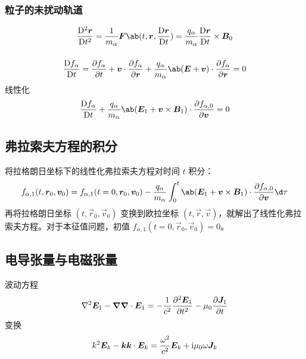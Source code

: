 \subsubsection{粒子的未扰动轨道}

\begin{equation}
\mdv[2]{\vec{r}}{t} = \frac{1}{m_\alpha} \vec{F}\ab(t, \vec{r}, \mdv{\vec{r}}{t})
= \frac{q_\alpha}{m_\alpha} \mdv{\vec{r}}{t} \times \vec{B}_0
\end{equation}

\subsubsection{}

\begin{equation}
\mdv{f_\alpha}{t} = \pdv{f_\alpha}{t}
+ \vec{v} \cdot \pdv{f_\alpha}{\vec{r}}
+ \frac{q_\alpha}{m_\alpha} \ab(\vec{E} + \vec{v} \textbf{}) \cdot \pdv{f_\alpha}{\vec{r}}
= 0
\end{equation}
线性化
\begin{equation}
\mdv{f_\alpha}{t}
+ \frac{q_\alpha}{m_\alpha}
\ab(\vec{E}_1 + \vec{v} \times \vec{B}_1)
\cdot \pdv{f_{\alpha, 0}}{\vec{v}}
= 0
\end{equation}

\subsection{弗拉索夫方程的积分}

将拉格朗日坐标下的线性化弗拉索夫方程对时间 $t$ 积分：
\begin{equation}
f_{\alpha,1}(t, \vec{r}_0, \vec{v}_0)
= f_{\alpha,1}(t=0, \vec{r}_0, \vec{v}_0)
- \frac{q_\alpha}{m_\alpha} \int_0^t
    \ab(\vec{E}_1 + \vec{v} \times \vec{B}_1)
    \cdot \pdv{f_{\alpha, 0}}{\vec{v}}
\d\tau
\end{equation}
再将拉格朗日坐标 $(t, \vec{r}_0, \vec{v}_0)$ 变换到欧拉坐标 $(t, \vec{r}, \vec{v})$，就解出了线性化弗拉索夫方程。对于本征值问题，初值 $f_{\alpha,1}(t=0, \vec{r}_0, \vec{v}_0) = 0$。

\subsection{电导张量与电磁张量}

波动方程
\begin{equation}
\nabla^2{\bm{E}_1} - \bm{\nabla}{\bm{\nabla} \cdot{\bm{E}_1}}
= - \frac{1}{c^2} \pdv[2]{\bm{E}_1}{t} - \mu_0 \pdv{\bm{J}_1}{t}
\end{equation}
变换
\begin{equation}
k^2 \bm{E}_k - \bm{k}\bm{k} \cdot \bm{E}_k
= \frac{\omega^2}{c^2} \bm{E}_k + \mathrm{i} \mu_0 \omega \bm{J}_k
\end{equation}


